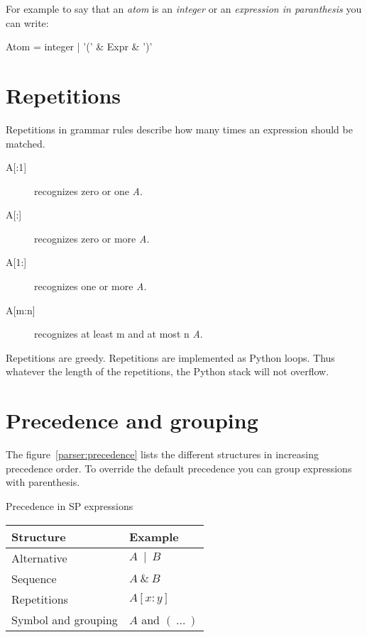 For example to say that an \emph{atom} is an \emph{integer} or an \emph{expression in paranthesis}
you can write:
\begin{verbatimtab}[4]
    Atom = integer | '(' & Expr & ')'
\end{verbatimtab}

\section{Repetitions}                                           \label{parser:repetitions}

Repetitions in grammar rules describe how many times an expression should be matched.

\begin{description}
    \item [{A[:1]}] recognizes zero or one \emph{A}.
    \item [{A[:]}] recognizes zero or more \emph{A}.
    \item [{A[1:]}] recognizes one or more \emph{A}.
    \item [{A[m:n]}] recognizes at least m and at most n \emph{A}.
\end{description}

Repetitions are greedy.
Repetitions are implemented as Python loops.
Thus whatever the length of the repetitions, the Python stack will not overflow. 

\section{Precedence and grouping}

The figure~\ref{parser:precedence} lists the different structures in increasing precedence order.
To override the default precedence you can group expressions with parenthesis.

\begin{tableau}
\caption{Precedence in SP expressions}                         \label{parser:precedence}
\begin{tabular}{| l | l |}
\hline
    Structure           & Example \\
\hline
\hline
    Alternative         & $A~\mid~B$ \\
\hline
    Sequence            & $A~\&~B$ \\
\hline
    Repetitions         & $A[x:y]$ \\
\hline
    Symbol and grouping & $A$ and $(~\ldots~)$ \\
\hline
\end{tabular}
\end{tableau}

